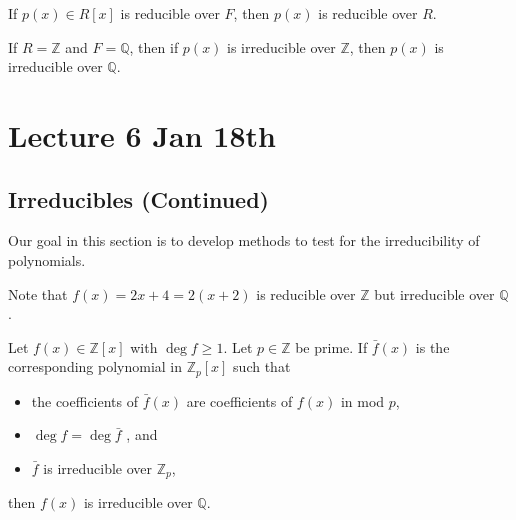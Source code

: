 \documentclass[notoc,notitlepage,nobib]{tufte-book}
\begin{document}
\begin{note}
  If $p(x) \in R[x]$ is reducible over $F$, then $p(x)$ is reducible over $R$.
\end{note}

\begin{note}
  If $R = \mathbb{Z}$ and $F = \mathbb{Q}$, then if $p(x)$ is irreducible over
  $\mathbb{Z}$, then $p(x)$ is irreducible over $\mathbb{Q}$.
\end{note}



\chapter{Lecture 6 Jan 18th}%
\label{chp:lecture_6_jan_18th}

\section{Irreducibles (Continued)}%
\label{sec:irreducibles_continued}

Our goal in this section is to develop methods to test for the irreducibility
of polynomials.

\begin{warning}
  Note that $f(x) = 2x + 4 = 2(x + 2)$ is reducible over $\mathbb{Z}$
   but
  irreducible over $\mathbb{Q}$.
\end{warning}

\begin{propo}\label{propo:mod_p_irreducibility_test}
  Let $f(x) \in \mathbb{Z}[x]$ with $\deg f \geq 1$. Let $p \in \mathbb{Z}$ be prime.
  If $\bar{f}(x)$ is the corresponding polynomial in $\mathbb{Z}_p[x]$ such that
  \begin{itemize}
    \item the coefficients of $\bar{f}(x)$ are coefficients of $f(x)$ in mod $p$,
    \item $\deg f = \deg \bar{f}$ , and
    \item $\bar{f}$ is irreducible over $\mathbb{Z}_p$,
  \end{itemize}
  then $f(x)$ is irreducible over $\mathbb{Q}$.
\end{propo}
\end{document}
